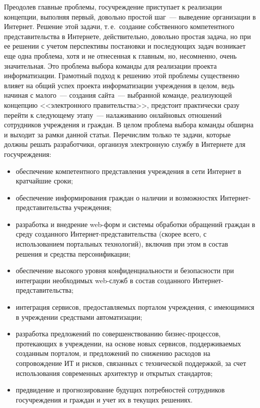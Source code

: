 \begin{multicols}{2}
Преодолев главные проблемы, госучреждение приступает к реализации концепции,
выполняя первый, довольно простой шаг~--- выведение организации в Интернет. Решение
этой задачи, т.\,е.\ создание собственного компетентного представительства в Интернете,
действительно, довольно простая задача, но при ее решении с учетом перспективы
постановки и последующих задач возникает еще одна проблема, хотя и не отнесенная к
главным, но, несомненно, очень значительная. Это проблема выбора команды для
реализации проекта информатизации. Грамотный подход к решению этой проблемы
существенно влияет на общий успех проекта информатизации учреждения в целом, ведь
начиная с малого~--- создания сайта~--- выбранной команде, реализующей концепцию
<<электронного правительства>>, предстоит практически сразу перейти к следующему
этапу~--- налаживанию онлайновых отношений сотрудников учреждения и граж\-дан. В
целом проблема выбора команды обширна и выходит за рамки данной статьи.
Перечислим только те задачи, которые должны решать разработчики, организуя
электронную службу в Интернете для госучреждения:
\begin{itemize}
\item обеспечение компетентного представления учреждения в сети Интернет в
кратчайшие \mbox{сроки};
\item обеспечение информирования граждан о наличии и возможностях
Интернет-пред\-ста\-ви\-тель\-ства учреждения;
\item разработка и внедрение web-форм и системы обработки обращений граждан в
среду созданного Интернет-представительства (скорее всего, с использованием
портальных технологий), включив при этом в состав решения и средства
персонификации;
\item обеспечение высокого уровня конфиденциальности и безопасности при
интеграции необходимых web-служб в состав созданного Интернет-представительства;
\item интеграция сервисов, предоставляемых порталом учреждения, с имеющимися в
учреждении средствами автоматизации;
\item разработка предложений по совершенствованию бизнес-процессов, протекающих
в уч\-реж\-де\-нии, на основе новых сервисов, поддерживаемых созданным порталом, и
предложений по снижению расходов на сопровождение ИТ
и рисков, связанных с технической поддержкой, за счет использования современных
архитектур и открытых стандартов;
\item предвидение и прогнозирование будущих потребностей сотрудников
госучреждения и граж\-дан и учет их в текущих решениях.
\end{itemize}


\end{multicols}
